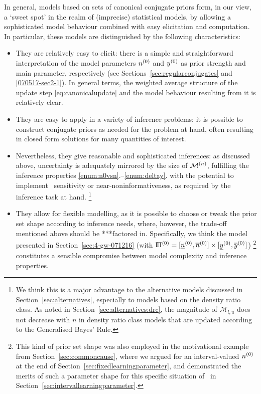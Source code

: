 In general, %
models based on sets of canonical conjugate priors form, in our view,
a `sweet spot' in the realm of (imprecise) statistical models,
by allowing a sophisticated model behaviour
combined with easy elicitation and computation.
In particular,
these models are distinguished by the following characteristics:

\begin{itemize}
\item They are relatively easy to elicit:
there is a simple and straightforward interpretation of the model parameters $n^{(0)}$ and $y^{(0)}$
as prior strength and main parameter, respectively (see Sections~\ref{sec:regularconjugates} and \ref{070517-sec2-1}).
In general terms, the weighted average structure of the update step \eqref{eq:canonicalupdate}
and the model behaviour resulting from it is relatively clear.
\item They are easy to apply in a variety of inference problems:
it is possible to construct conjugate priors as needed for the problem at hand,
often resulting in closed form solutions for many quantities of interest.
\item Nevertheless, they give reasonable and sophisticated inferences:
as discussed above, uncertainty is adequately mirrored by the size of $\mathcal{M}^{(n)}$,
fulfilling the inference properties \ref{enum:n0vsn}.--\ref{enum:deltay}.
with the potential to implement \pdc\ sensitivity or near-noninformativeness,
as required by the inference task at hand.%
\footnote{We think this is a major advantage to the alternative models
discussed in Section~\ref{sec:alternatives},
especially to models based on the density ratio class.
As noted in Section~\ref{sec:alternatives:drc}, the magnitude of $\mathcal{M}_{l,u}$ %
does not decrease with $n$ in density ratio class models that are updated according to the Generalised Bayes' Rule.}
\item They allow for flexible modelling, as
it is possible to choose or tweak the prior set shape according to inference needs,
where, however, the trade-off mentioned above should be ***factored in. %
Specifically, we think the model presented in Section~\ref{sec:4-gw-071216}
(with $\text{I}\!\Pi^{(0)} = [\underline{n}^{(0)}, \overline{n}^{(0)}] \times [\underline{y}^{(0)}, \overline{y}^{(0)}]$)%
\footnote{This kind of prior set shape was also employed in the motivational example
from Section~\ref{sec:commoncause}, where we argued for an interval-valued $n^{(0)}$
at the end of Section~\ref{sec:fixedlearningparameter},
and demonstrated the merits of such a parameter shape for this specific situation of \pdc\
in Section~\ref{sec:intervallearningparameter}.}
constitutes a sensible compromise between model complexity and inference properties.
\end{itemize}

